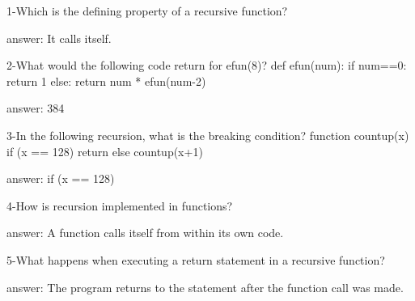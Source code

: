 1-Which is the defining property of a recursive function?

answer: It calls itself.

2-What would the following code return for efun(8)?
def efun(num):
  if num==0:
  return 1
  else:
  return num * efun(num-2)
  
answer: 384

3-In the following recursion, what is the breaking condition?
  function countup(x) {
    if (x == 128)
    return
  else
    countup(x+1)
  }

answer: if (x == 128)

4-How is recursion implemented in functions?

answer: A function calls itself from within its own code.

5-What happens when executing a return statement in a recursive function?

answer: The program returns to the statement after the function call was made.
